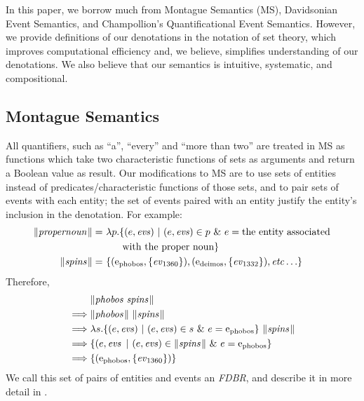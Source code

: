 \documentclass[../main.tex]{subfiles}
\begin{document}
\begin{refsection}
In this paper, we borrow much from Montague Semantics (MS), Davidsonian Event Semantics,
and Champollion's Quantificational Event Semantics. However, we provide definitions of our
denotations in the notation of set theory, which improves computational efficiency and, we
believe, simplifies understanding of our denotations. We also believe that our semantics is
intuitive, systematic, and compositional.

\subsection{Montague Semantics}

All quantifiers, such as ``a'', ``every'' and ``more than two'' are treated in MS as functions which take two characteristic functions of sets as arguments and return a Boolean value as result. Our modifications to MS are to use sets of entities instead of predicates/characteristic functions of those sets, and to pair sets of events with each entity; the set of events paired with an entity justify the entity’s inclusion in the denotation. For example:
\begin{equation*}
	\begin{split}
		\meaningof{propernoun} =&\ \lambda p.
		\{(e, \evs)\ |\ (e, \evs) \in p\ \&\ e = \dmathrm{the\ entity\ associated} \\ & \qquad \dmathrm{with\ the\ proper\ noun}\} \\
		\meaningof{spins} =&\ \{(\entityassoc{phobos}, \{\eventassoc{1360}\}), (\entityassoc{deimos}, \{\eventassoc{1332}\}), \etc\}
	\end{split}
\end{equation*}
Therefore,
\begin{equation*}
	\begin{split}
		& \meaningof{phobos spins} \\
		\implies& \meaningof{phobos}\ \meaningof{spins} \\
		\implies& \lambda s.\{(e, \evs)\ |\ (e, \evs) \in s\ \&\ e = \entityassoc{phobos}\}\ \meaningof{spins} \\
		\implies& \{(e, \evs\ |\ (e, \evs) \in \meaningof{spins}\ \&\ e = \entityassoc{phobos}\}\ \\
		\implies& \{(\entityassoc{phobos}, \{\eventassoc{1360}\})\}
	\end{split}
\end{equation*}
We call this set of pairs of entities and events an \textit{FDBR}, and describe it in more detail in .

\end{refsection}
\end{document}
